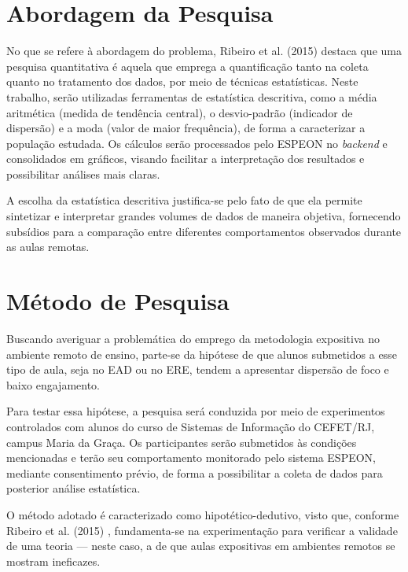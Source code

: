 \section{Abordagem da Pesquisa}
No que se refere à abordagem do problema, Ribeiro et al. (2015) \cite{ribeiroManagementAccountingAnalysis2015} destaca que uma pesquisa quantitativa é aquela que emprega a quantificação tanto na coleta quanto no tratamento dos dados, por meio de técnicas estatísticas. Neste trabalho, serão utilizadas ferramentas de estatística descritiva, como a média aritmética (medida de tendência central), o desvio-padrão (indicador de dispersão) e a moda (valor de maior frequência), de forma a caracterizar a população estudada. Os cálculos serão processados pelo ESPEON no \textit{backend} e consolidados em gráficos, visando facilitar a interpretação dos resultados e possibilitar análises mais claras.

A escolha da estatística descritiva justifica-se pelo fato de que ela permite sintetizar e interpretar grandes volumes de dados de maneira objetiva, fornecendo subsídios para a comparação entre diferentes comportamentos observados durante as aulas remotas.


\section{Método de Pesquisa}
Buscando averiguar a problemática do emprego da metodologia expositiva no ambiente remoto de ensino, parte-se da hipótese de que alunos submetidos a esse tipo de aula, seja no EAD ou no ERE, tendem a apresentar dispersão de foco e baixo engajamento.

Para testar essa hipótese, a pesquisa será conduzida por meio de experimentos controlados com alunos do curso de Sistemas de Informação do CEFET/RJ, campus Maria da Graça. Os participantes serão submetidos às condições mencionadas e terão seu comportamento monitorado pelo sistema ESPEON, mediante consentimento prévio, de forma a possibilitar a coleta de dados para posterior análise estatística.

O método adotado é caracterizado como hipotético-dedutivo, visto que, conforme Ribeiro et al. (2015) \cite{ribeiroManagementAccountingAnalysis2015}, fundamenta-se na experimentação para verificar a validade de uma teoria — neste caso, a de que aulas expositivas em ambientes remotos se mostram ineficazes.

